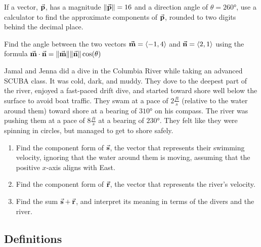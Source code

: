 \begin{myPractice}
	If a vector, $\vec{\textbf{p}}$, has a magnitude $\lVert\vec{\textbf{p}}\rVert=16$ and a direction angle of $\theta=\ang{260}$, use a calculator to find the approximate components of $\vec{\textbf{p}}$, rounded to two digits behind the decimal place.
\end{myPractice}
\vfill

\newpage

\begin{myPractice}
	Find the angle between the two vectors $\vec{\textbf{m}}=\left\langle -1,4 \right\rangle$ and $\vec{\textbf{n}}=\left\langle 2,1 \right\rangle$ using the formula $\vec{\textbf{m}}\cdot\vec{\textbf{n}}=\lVert\vec{\textbf{m}}\rVert\lVert\vec{\textbf{n}}\rVert\cos(\theta)$
	\vfill
\end{myPractice}

\begin{myPractice}
	Jamal and Jenna did a dive in the Columbia River while taking an advanced SCUBA class. It was cold, dark, and muddy. They dove to the deepest part of the river, enjoyed a fast-paced drift dive, and started toward shore well below the surface to avoid boat traffic. They swam at a pace of $2\frac{ft}{s}$ (relative to the water around them) toward shore at a bearing of $\ang{310}$ on his compass. The river was pushing them at a pace of $8\frac{ft}{s}$ at a bearing of $\ang{230}$. They felt like they were spinning in circles, but managed to get to shore safely.
	\begin{enumerate}
		\item Find the component form of $\vec{\textbf{s}}$, the vector that represents their swimming velocity, ignoring that the water around them is moving, assuming that the positive $x$-axis aligns with East.
		\vfill
		\item Find the component form of $\vec{\textbf{r}}$, the vector that represents the river's velocity.
		\vfill
		\item Find the sum $\vec{\textbf{s}}+\vec{\textbf{r}}$, and interpret its meaning in terms of the divers and the river.
		\vfill
	\end{enumerate}
\end{myPractice}
\newpage

\subsection*{Definitions} \label{definitions-section-vectors}

